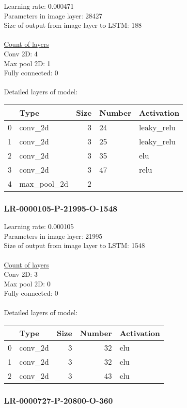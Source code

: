 Learning rate: 0.000471
\\Parameters in image layer: 28427
\\Size of output from image layer to LSTM: 188
\\\\\underline{Count of layers} 
\\Conv 2D:           4\\Max pool 2D:      1\\Fully connected:  0
\\\\Detailed layers of model: \\\begin{tabular}{rlrll}
\hline
    & Type        &   Size & Number   & Activation   \\
\hline
  0 & conv\_2d     &      3 & 24       & leaky\_relu   \\
  1 & conv\_2d     &      3 & 25       & leaky\_relu   \\
  2 & conv\_2d     &      3 & 35       & elu          \\
  3 & conv\_2d     &      3 & 47       & relu         \\
  4 & max\_pool\_2d &      2 &          &              \\
\hline
\end{tabular}\subsubsection*{LR-0000105-P-21995-O-1548}
Learning rate: 0.000105
\\Parameters in image layer: 21995
\\Size of output from image layer to LSTM: 1548
\\\\\underline{Count of layers} 
\\Conv 2D:           3\\Max pool 2D:      0\\Fully connected:  0
\\\\Detailed layers of model: \\\begin{tabular}{rlrrl}
\hline
    & Type    &   Size &   Number & Activation   \\
\hline
  0 & conv\_2d &      3 &       32 & elu          \\
  1 & conv\_2d &      3 &       32 & elu          \\
  2 & conv\_2d &      3 &       43 & elu          \\
\hline
\end{tabular}\subsubsection*{LR-0000727-P-20800-O-360}
